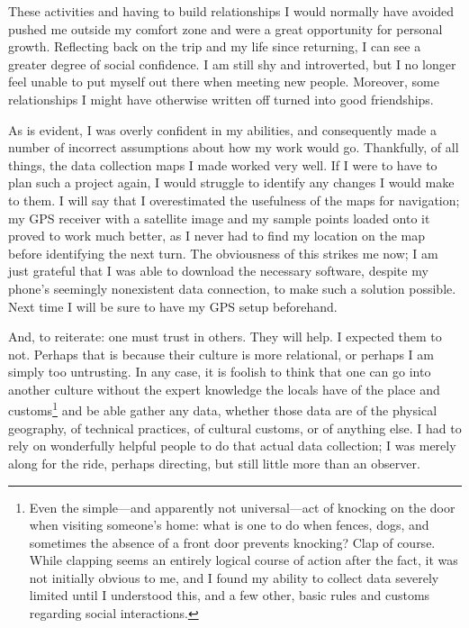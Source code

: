These activities and having to build relationships I would normally have avoided pushed me outside my comfort zone and were a great opportunity for personal growth. Reflecting back on the trip and my life since returning, I can see a greater degree of social confidence. I am still shy and introverted, but I no longer feel unable to put myself out there when meeting new people. Moreover, some relationships I might have otherwise written off turned into good friendships.

As is evident, I was overly confident in my abilities, and consequently made a number of incorrect assumptions about how my work would go. Thankfully, of all things, the data collection maps I made worked very well. If I were to have to plan such a project again, I would struggle to identify any changes I would make to them. I will say that I overestimated the usefulness of the maps for navigation; my GPS receiver with a satellite image and my sample points loaded onto it proved to work much better, as I never had to find my location on the map before identifying the next turn. The obviousness of this strikes me now; I am just grateful that I was able to download the necessary software, despite my phone’s seemingly nonexistent data connection, to make such a solution possible. Next time I will be sure to have my GPS setup beforehand.

And, to reiterate: one must trust in others. They will help. I expected them to not. Perhaps that is because their culture is more relational, or perhaps I am simply too untrusting. In any case, it is foolish to think that one can go into another culture without the expert knowledge the locals have of the place and customs\footnote{Even the simple---and apparently not universal---act of knocking on the door when visiting someone's home: what is one to do when fences, dogs, and sometimes the absence of a front door prevents knocking? Clap of course. While clapping seems an entirely logical course of action after the fact, it was not initially obvious to me, and I found my ability to collect data severely limited until I understood this, and a few other, basic rules and customs regarding social interactions.} and be able gather any data, whether those data are of the physical geography, of technical practices, of cultural customs, or of anything else. I had to rely on wonderfully helpful people to do that actual data collection; I was merely along for the ride, perhaps directing, but still little more than an observer. 
